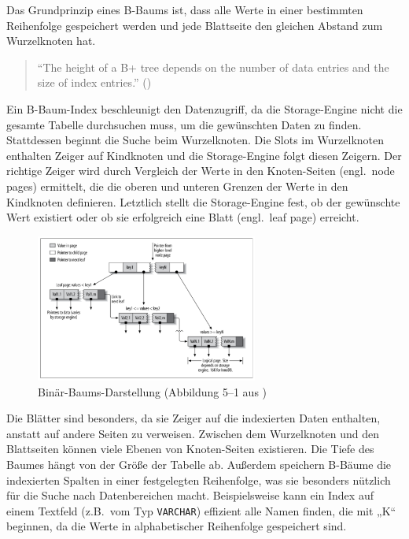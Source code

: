 Das Grundprinzip eines B-Baums ist, dass alle Werte in einer bestimmten Reihenfolge gespeichert werden und jede Blattseite den gleichen Abstand zum Wurzelknoten hat.

\begin{quote}
    \enquote{The height of a B+ tree depends on the number of data entries and the size of index entries.} (\cite[S. 358]{ramakrishnan2002database})
\end{quote}

Ein B-Baum-Index beschleunigt den Datenzugriff, da die Storage-Engine nicht die gesamte Tabelle durchsuchen muss, um die gewünschten Daten zu finden.
Stattdessen beginnt die Suche beim Wurzelknoten.
Die Slots im Wurzelknoten enthalten Zeiger auf Kindknoten und die Storage-Engine folgt diesen Zeigern.
Der richtige Zeiger wird durch Vergleich der Werte in den Knoten-Seiten (engl.\ node pages) ermittelt, die die oberen und unteren Grenzen der Werte in den Kindknoten definieren.
Letztlich stellt die Storage-Engine fest, ob der gewünschte Wert existiert oder ob sie erfolgreich eine Blatt (engl.\ leaf page) erreicht.

\vspace{-8pt}
\begin{figure}[H]
    \centering
    \includegraphics[width=0.65\textwidth]{PNGs/Textbook/B_Tree_Visualisation}
    \caption[Binärbaum-Visualisierung]{Binär-Baums-Darstellung (Abbildung 5--1 aus \cite[S. 149]{schwartz2012high})}
    \label{fig:b-tree-visualisation}
\end{figure}
\vspace{-20pt}

Die Blätter sind besonders, da sie Zeiger auf die indexierten Daten enthalten, anstatt auf andere Seiten zu verweisen.
Zwischen dem Wurzelknoten und den Blattseiten können viele Ebenen von Knoten-Seiten existieren.
Die Tiefe des Baumes hängt von der Größe der Tabelle ab.
Außerdem speichern B-Bäume die indexierten Spalten in einer festgelegten Reihenfolge, was sie besonders nützlich für die Suche nach Datenbereichen macht.
Beispielsweise kann ein Index auf einem Textfeld (z.B.\ vom Typ \texttt{VARCHAR}) effizient alle Namen finden, die mit „K“ beginnen, da die Werte in alphabetischer Reihenfolge gespeichert sind.


